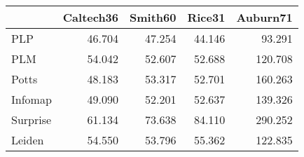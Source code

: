 \begin{tabular}{lrrrr}
\toprule
{} & Caltech36 & Smith60 & Rice31 & Auburn71 \\
\midrule
PLP      &    46.704 &  47.254 & 44.146 &   93.291 \\
PLM      &    54.042 &  52.607 & 52.688 &  120.708 \\
Potts    &    48.183 &  53.317 & 52.701 &  160.263 \\
Infomap  &    49.090 &  52.201 & 52.637 &  139.326 \\
Surprise &    61.134 &  73.638 & 84.110 &  290.252 \\
Leiden   &    54.550 &  53.796 & 55.362 &  122.835 \\
\bottomrule
\end{tabular}
